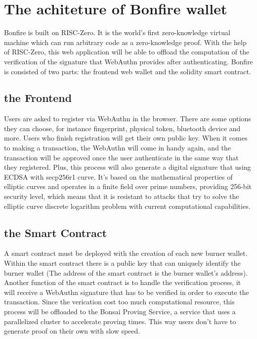 \documentclass[conference]{IEEEtran}
\begin{document}
\section{The achiteture of Bonfire wallet}
Bonfire is built on RISC-Zero. It is the world's first zero-knowledge virtual machine which can run 
arbitrary code as a zero-knowledge proof. With the help of RISC-Zero, this web application will be 
able to offload the computation of the verification of the signature that WebAuthn provides  
after authenticating. Bonfire is consisted of two parts: the frontend web wallet and the solidity 
smart contract.  

\subsection{the Frontend}\label{AA}
Users are asked to register via WebAuthn in the browser. There are some options they can choose, for 
instance fingerprint, physical token, bluetooth device and more. Users who finish registration will
get their own public key. When it comes to making a transaction, the WebAuthn will come in handy 
again, and the transaction will be approved once the user authenticate in the same way that they registered.
Plus, this process will also generate a digital signature that using ECDSA with secp256r1 curve. It's 
based on the mathematical properties of elliptic curves and operates in a finite field over prime numbers, 
providing 256-bit security level, which means that it is resistant to attacks that try to solve the 
elliptic curve discrete logarithm problem with current computational capabilities.

\subsection{the Smart Contract}
A smart contract must be deployed with the creation of each new burner wallet. Within the smart contract
there is a public key that can uniquely identify the burner wallet (The address of the smart contract 
is the burner wallet's address). Another function of the smart contract is to handle the verification 
process, it will receive a WebAuthn signature that has to be verified in order to execute the transaction. 
Since the verication cost too much computational resource, this process will be offloaded to the Bonsai 
Proving Service, a service that uses a parallelized cluster to accelerate proving times. This way users 
don't have to generate proof on their own with slow speed. 
\end{document}
